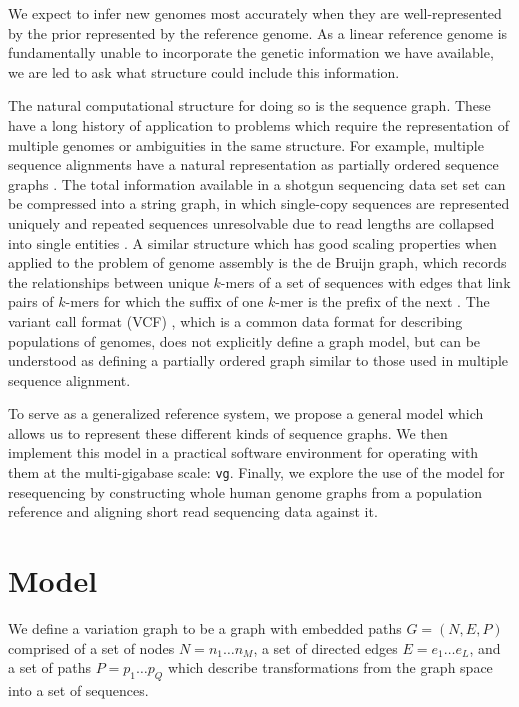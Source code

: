\documentclass{article}
\begin{document}
We expect to infer new genomes most accurately when they are well-represented by the prior represented by the reference genome.
As a linear reference genome is fundamentally unable to incorporate the genetic information we have available, we are led to ask what structure could include this information.

The natural computational structure for doing so is the sequence graph.
These have a long history of application to problems which require the representation of multiple genomes or ambiguities in the same structure.
For example, multiple sequence alignments have a natural representation as partially ordered sequence graphs \cite{lee2002POA}.
The total information available in a shotgun sequencing data set set can be compressed into a string graph, in which single-copy sequences are represented uniquely and repeated sequences unresolvable due to read lengths are collapsed into single entities \cite{myers2005, simpson2010}.
A similar structure which has good scaling properties when applied to the problem of genome assembly is the de Bruijn graph, which records the relationships between unique $k$-mers of a set of sequences with edges that link pairs of $k$-mers for which the suffix of one $k$-mer is the prefix of the next \cite{iqbal2012}.
The variant call format (VCF) \cite{danecek2011}, which is a common data format for describing populations of genomes, does not explicitly define a graph model, but can be understood as defining a partially ordered graph similar to those used in multiple sequence alignment. 

To serve as a generalized reference system, we propose a general model which allows us to represent these different kinds of sequence graphs. We then implement this model in a practical software environment for operating with them at the multi-gigabase scale: {\tt vg}. Finally, we explore the use of the model for resequencing by constructing whole human genome graphs from a population reference and aligning short read sequencing data against it.

\section{Model}

We define a variation graph to be a graph with embedded paths $G = ( N, E, P )$ comprised of
a set of nodes $N = n_1 \ldots n_M$,
a set of directed edges $E = e_1 \ldots e_L$,
and a set of paths $P = p_1 \ldots p_Q$ which describe transformations from the graph space into a set of sequences.
\end{document}

